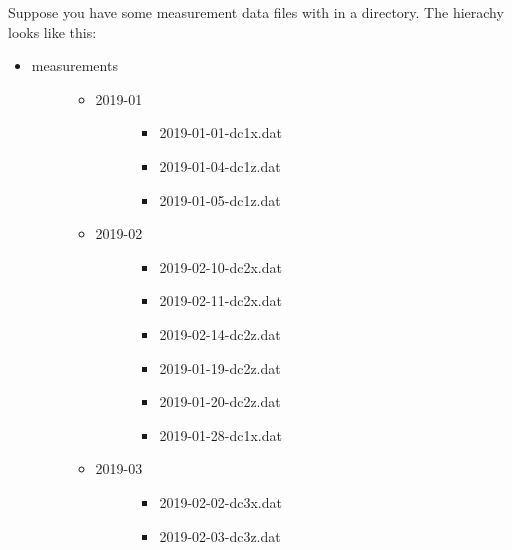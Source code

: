 \documentclass[letterpaper,10pt,english]{sphinxmanual}
\begin{document}
Suppose you have some measurement data files with in a directory. The hierachy looks like this:
\begin{itemize}
\item {} \begin{description}
\item[{measurements}] \leavevmode\begin{itemize}
\item {} \begin{description}
\item[{2019-01}] \leavevmode\begin{itemize}
\item {} 
2019-01-01-dc1x.dat

\item {} 
2019-01-04-dc1z.dat

\item {} 
2019-01-05-dc1z.dat

\end{itemize}

\end{description}

\item {} \begin{description}
\item[{2019-02}] \leavevmode\begin{itemize}
\item {} 
2019-02-10-dc2x.dat

\item {} 
2019-02-11-dc2x.dat

\item {} 
2019-02-14-dc2z.dat

\item {} 
2019-01-19-dc2z.dat

\item {} 
2019-01-20-dc2z.dat

\item {} 
2019-01-28-dc1x.dat

\end{itemize}

\end{description}

\item {} \begin{description}
\item[{2019-03}] \leavevmode\begin{itemize}
\item {} 
2019-02-02-dc3x.dat

\item {} 
2019-02-03-dc3z.dat

\end{itemize}

\end{description}

\end{itemize}

\end{description}

\end{itemize}
\end{document}
